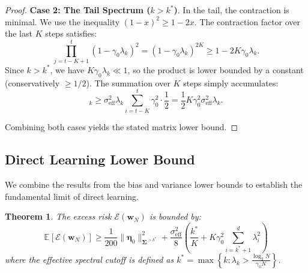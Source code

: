\documentclass{article}
\theoremstyle{definition}
\theoremstyle{definition}
\theoremstyle{plain}
\newtheorem{theorem}{Theorem}
\theoremstyle{plain}
\theoremstyle{plain}
\theoremstyle{plain}
\theoremstyle{plain}
\newcommand{\bs}[1]{\boldsymbol{\mathbf{#1}}}
\newcommand{\eff}{\mathrm{eff}}
\newcommand{\Sig}{\mathbf{\Sigma}}
\newcommand{\ex}[2][]{\mathbb{E}_{#1}\left[ #2 \right]}
\begin{document}
\begin{proof}
    \textbf{Case 2: The Tail Spectrum ($k > k^*$)}.
    In the tail, the contraction is minimal. We use the inequality $(1-x)^2 \ge 1-2x$. The contraction factor over the last $K$ steps satisfies:
    \begin{equation}
        \prod_{j=t-K+1}^t (1-\gamma_0 \lambda_k)^2 = (1 - \gamma_0 \lambda_k)^{2K} \ge 1 - 2K\gamma_0 \lambda_k.
    \end{equation}
    Since $k > k^*$, we have $K \gamma_0 \lambda_k \ll 1$, so the product is lower bounded by a constant (conservatively $\ge 1/2$). The summation over $K$ steps simply accumulates:
    \begin{equation}
        [\tilde{\bs C}_t]_k \ge \sigma_\eff^2 \lambda_k \sum_{i=t-K}^t \gamma_0^2 \cdot \frac{1}{2} = \frac{1}{2} K \gamma_0^2 \sigma_\eff^2 \lambda_k.
    \end{equation}
    
    Combining both cases yields the stated matrix lower bound.
\end{proof}

\subsection{Direct Learning Lower Bound}
\label{subsec:directlowerbound}

We combine the results from the bias and variance lower bounds to establish the fundamental limit of direct learning.

\begin{theorem}
    The excess risk $\mathcal{E}(\bs w_N)$ is bounded by:
    \begin{equation}
        \ex{\mathcal{E}(\bs w_{N})}\geq \frac{1}{200}\|\bs\eta_0\|^2_{\Sig^{>k^*}} + \frac{\sigma_\eff^2}{8}\left( \frac{k^*}{K} + K\gamma_0^2 \sum_{i = k^*+1}^{d} \lambda_{i}^2 \right)
    \end{equation}
    where the effective spectral cutoff is defined as $k^* = \max\left\{k:\lambda_{k}> \frac{\log_2 N}{\gamma_0 N} \right\}$.
\end{theorem}
\end{document}

